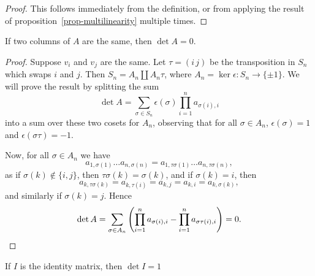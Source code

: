\begin{proof}
	This follows immediately from the definition, or from applying the result of proposition~\ref{prop-multilinearity} multiple times. %
\end{proof}

\begin{proposition}
	If two columns of $A$ are the same, then $\det A=0$. %
\end{proposition}

\begin{proof}
	Suppose $v_i$ and $v_j$ are the same. Let $\tau=(i\,j)$ be the transposition in $S_n$ which swaps $i$ and $j$. Then $S_n = A_n \coprod A_n\tau$, where $A_n = \ker \epsilon : S_n \to \{\pm 1\} $. We will prove the result by splitting the sum %
	\begin{equation*}
		\det A = \sum_{\sigma\in S_n} \epsilon(\sigma) \prod_{i=1}^n a_{\sigma(i),i} 
	\end{equation*}
	into a sum over these two cosets for $A_n$, observing that for all $\sigma \in A_n$, $\epsilon(\sigma)=1$ and $\epsilon(\sigma\tau)=-1$. %

	Now, for all $\sigma \in A_n$ we have
	\begin{equation*}
		a_{1,\sigma(1)} \ldots a_{n,\sigma(n)} = a_{1,\tau\sigma(1)} \ldots a_{n,\tau\sigma(n)}, %
	\end{equation*}
	as if $\sigma(k)\not\in\{i,j\}$, then $\tau\sigma(k) = \sigma(k)$,  and if $\sigma(k) = i$, then %
	\begin{equation*}
		a_{k,\tau\sigma(k)} = a_{k,\tau(i)} = a_{k,j} = a_{k,i} = a_{k,\sigma(k)},
	\end{equation*}
	and similarly  if $\sigma(k)=j$. Hence
	\begin{equation*}
		\det A = \sum_{\sigma\in A_n} \left( \prod_{i=1}^n a_{\sigma(i),i} - \prod_{i=1}^n a_{\sigma\tau(i),i} \right) = 0. \qedhere %
	\end{equation*}
\end{proof}

\begin{proposition}
	If $I$ is the identity matrix, then $\det I=1$ %
\end{proposition}

